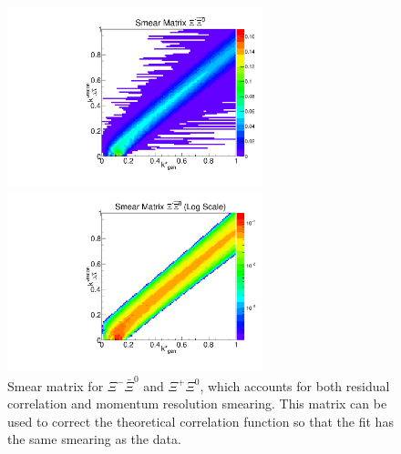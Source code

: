 \begin{figure}[ht]
\begin{minipage}{17.5pc}
\includegraphics[width=17.5pc]{Figures/SmearMatrices/2016-7-19-SmearMatrixXiCXi0NormLA.pdf}
\end{minipage}\hspace{0.5pc}
\begin{minipage}{17.5pc}
\includegraphics[width=17.5pc]{Figures/SmearMatrices/2016-7-19-SmearMatrixXiCXi0NormLALog.pdf}
\end{minipage} 
\caption[Smear matrix -- $\Xi^{-}\bar{\Xi}^0$ and $\Xi^{+}\Xi^0$]{\label{fig:SmearXiCXi0LA}
Smear matrix for $\Xi^{-}\bar{\Xi}^0$ and $\Xi^{+}\Xi^0$, which accounts for both residual correlation and momentum resolution smearing. This matrix can be used to correct the theoretical correlation function so that the fit has the same smearing as the data.
}
\end{figure}


